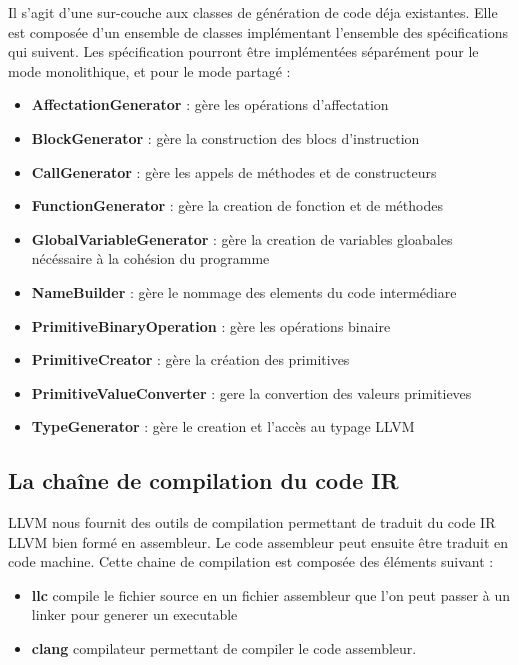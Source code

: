 \documentclass{article}
\begin{document}
Il s'agit d'une sur-couche aux classes de génération de code déja existantes. Elle est composée d'un ensemble de classes implémentant l'ensemble des spécifications qui suivent. Les spécification pourront être implémentées séparément pour le mode monolithique, et pour le mode partagé :
\begin{itemize}
\item \textbf{AffectationGenerator} : gère les opérations d'affectation
\item \textbf{BlockGenerator} : gère la construction des blocs d'instruction
\item \textbf{CallGenerator} : gère les appels de méthodes et de constructeurs
\item \textbf{FunctionGenerator} : gère la creation de fonction et de méthodes
\item \textbf{GlobalVariableGenerator} : gère la creation de variables gloabales nécéssaire à la cohésion du programme
\item \textbf{NameBuilder} : gère le nommage des elements du code intermédiare
\item \textbf{PrimitiveBinaryOperation} : gère les opérations binaire
\item \textbf{PrimitiveCreator} : gère la création des primitives
\item \textbf{PrimitiveValueConverter} : gere la convertion des valeurs primitieves
\item \textbf{TypeGenerator} : gère le creation et l'accès au typage LLVM

\end{itemize}

\subsection{La chaîne de compilation du code IR}

LLVM nous fournit des outils de compilation permettant de traduit du code IR LLVM bien formé
en assembleur. Le code assembleur peut ensuite être traduit en code machine.
Cette chaine de compilation est composée des éléments suivant :

\begin{itemize}
 \item \textbf{llc} compile le fichier source en un fichier assembleur que l'on peut passer à un linker pour generer un executable
 \item \textbf{clang} compilateur permettant de compiler le code assembleur.
\end{itemize}
\end{document}
